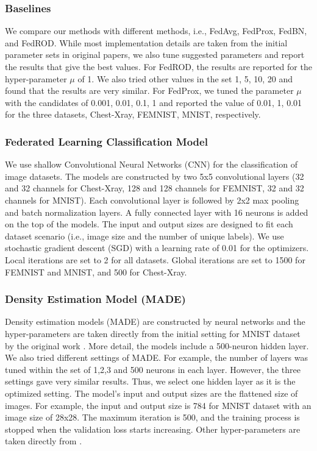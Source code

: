 \documentclass[mathfont=newtx]{uai2023} %
\begin{document}
\subsubsection{Baselines}
We compare our methods with different methods, i.e., FedAvg, FedProx, FedBN, and FedROD. While most implementation details are taken from the initial parameter sets in original papers, we also tune suggested parameters and report the results that give the best values. For FedROD, the results are reported for the hyper-parameter $\mu$ of 1. We also tried other values in the set {1, 5, 10, 20} and found that the results are very similar. For FedProx, we tuned the parameter $\mu$ with the candidates of {0.001, 0.01, 0.1, 1} and reported the value of 0.01, 1, 0.01 for the three datasets, Chest-Xray, FEMNIST, MNIST, respectively. 

\subsubsection{Federated Learning Classification Model} We use shallow Convolutional Neural Networks (CNN) for the classification of image datasets. The models are constructed by two 5x5 convolutional layers (32 and 32 channels for Chest-Xray, 128 and 128 channels for FEMNIST, 32 and 32 channels for MNIST). Each convolutional layer is followed by 2x2 max pooling and batch normalization layers. A fully connected layer with 16 neurons is added on the top of the models. The input and output sizes are designed to fit each dataset scenario (i.e., image size and the number of unique labels). We use stochastic gradient descent (SGD) with a learning rate of 0.01 for the optimizers. Local iterations are set to 2 for all datasets. Global iterations are set to 1500 for FEMNIST and MNIST, and 500 for Chest-Xray. 

\subsubsection{Density Estimation Model (MADE)} Density estimation models (MADE) are constructed by neural networks and the hyper-parameters are taken directly from the initial setting for MNIST dataset by the original work \cite{MADE}. More detail, the models include a 500-neuron hidden layer. We also tried different settings of MADE. For example, the number of layers was tuned within the set of {1,2,3} and 500 neurons in each layer. However, the three settings gave very similar results. Thus, we select one hidden layer as it is the optimized setting. The model's input and output sizes are the flattened size of images. For example, the input and output size is 784 for MNIST dataset with an image size of 28x28. The maximum iteration is 500, and the training process is stopped when the validation loss starts increasing. Other hyper-parameters are taken directly from \cite{MADE}.
\end{document}
